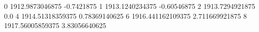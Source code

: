 0 1912.9873046875 -0.7421875
1 1913.1240234375 -0.60546875
2 1913.7294921875 0.0
4 1914.51318359375 0.78369140625
6 1916.441162109375 2.711669921875
8 1917.56005859375 3.83056640625
